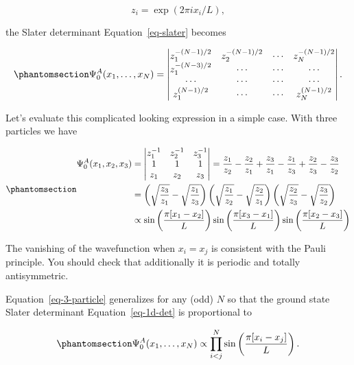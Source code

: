 \documentclass[
  a4paper,
]{scrbook}
\begin{document}
\[
z_{i}=\exp(2 \pi i x_{i}/L),
\]

the Slater determinant Equation~\ref{eq-slater} becomes

\begin{equation}\phantomsection\label{eq-1d-det}{
    \Psi^A_0(x_1,\ldots, x_N)=\begin{vmatrix}
    z_{1}^{-(N-1)/2} &  z_{2}^{-(N-1)/2} & \cdots & z_{N}^{-(N-1)/2} \\
    z_{1}^{-(N-3)/2} &  \cdots & \cdots & \cdots  \\
    \cdots & \cdots & \cdots & \cdots  \\
    z_{1}^{(N-1)/2} &  \cdots & \cdots & z_{N}^{(N-1)/2}
\end{vmatrix}.
}\end{equation}

Let's evaluate this complicated looking expression in a simple case.
With three particles we have

\begin{equation}\phantomsection\label{eq-3-particle}{
\begin{align}
    \Psi^A_0(x_1,x_2,x_3)&=\begin{vmatrix}
        z_{1}^{-1} & z_{2}^{-1} & z_{3}^{-1} \\
        1 & 1 & 1 \\
        z_{1} & z_{2} & z_{3}
    \end{vmatrix} = \frac{z_{1}}{z_{2}}-\frac{z_{2}}{z_{1}}+\frac{z_{3}}{z_{1}}-\frac{z_{1}}{z_{3}}+\frac{z_{2}}{z_{3}}-\frac{z_{3}}{z_{2}}\nonumber\\
    &=\left(\sqrt{\frac{z_{3}}{z_{1}}}-\sqrt{\frac{z_{1}}{z_{3}}}\right)\left(\sqrt{\frac{z_{1}}{z_{2}}}-\sqrt{\frac{z_{2}}{z_{1}}}\right)\left(\sqrt{\frac{z_{2}}{z_{3}}}-\sqrt{\frac{z_{3}}{z_{2}}}\right)  \nonumber\\
    &\propto \sin\left(\frac{ \pi[x_{1}-x_{2}]}{L}\right)\sin\left(\frac{ \pi[x_{3}-x_{1}]}{L}\right)\sin\left(\frac{ \pi[x_{2}-x_{3}]}{L}\right)
\end{align} 
}\end{equation}

The vanishing of the wavefunction when \(x_{i}=x_{j}\) is consistent
with the Pauli principle. You should check that additionally it is
periodic and totally antisymmetric.

Equation~\ref{eq-3-particle} generalizes for any (odd) \(N\) so that the
ground state Slater determinant Equation~\ref{eq-1d-det} is proportional
to

\begin{equation}\phantomsection\label{eq-1d-fermi-gs}{
\Psi^A_0(x_1,\ldots, x_N)\propto\prod_{i<j}^{N} \sin\left(\frac{\pi[x_{i}-x_{j}]}{L}\right).
}\end{equation}
\end{document}
